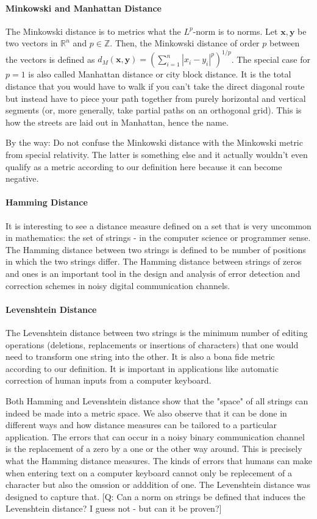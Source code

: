 \paragraph{Minkowski and Manhattan Distance}
The Minkowski distance is to metrics what the $L^p$-norm is to norms. Let $\mathbf{x,y}$ be two vectors in $\mathbb{R}^n$ and $p \in \mathbb{Z}$. Then, the Minkowski distance of order $p$ between the vectors is defined as $d_M(\mathbf{x,y}) = (\sum_{i=1}^n |x_i - y_i|^p )^{1/p}$. The special case for $p=1$ is also called Manhattan distance or city block distance. It is the total distance that you would have to walk if you can't take the direct diagonal route but instead have to piece your path together from purely horizontal and vertical segments (or, more generally, take partial paths on an orthogonal grid). This is how the streets are laid out in Manhattan, hence the name. 

\medskip
By the way: Do not confuse the Minkowski distance with the Minkowski metric from special relativity. The latter is something else and it actually wouldn't even qualify as a metric according to our definition here because it can become negative.

\paragraph{Hamming Distance} 
It is interesting to see a distance measure defined on a set that is very uncommon in mathematics: the set of strings - in the computer science or programmer sense. The Hamming distance between two strings is defined to be number of positions in which the two strings differ. The Hamming distance between strings of zeros and ones is an important tool in the design and analysis of error detection and correction schemes in noisy digital communication channels. 

\paragraph{Levenshtein Distance} 
The Levenshtein distance between two strings is the minimum number of editing operations (deletions, replacements or insertions of characters) that one would need to transform one string into the other. It is also a bona fide metric according to our definition. It is important in applications like automatic correction of human inputs from a computer keyboard.

\medskip
Both Hamming and Levenshtein distance show that the "space" of all strings can indeed be made into a metric space. We also observe that it can be done in different ways and how distance measures can be tailored to a particular application. The errors that can occur in a noisy binary communication channel is the replacement of a zero by a one or the other way around. This is precisely what the Hamming distance measures. The kinds of errors that humans can make when entering text on a computer keyboard cannot only be replecement of a character but also the omssion or adddition of one. The Levenshtein distance was designed to capture that. [Q: Can a norm on strings be defined that induces the Levenshtein distance? I guess not - but can it be proven?] 

